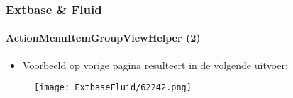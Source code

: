 
\begin{frame}[fragile]
	\frametitle{Extbase \& Fluid}
	\framesubtitle{ActionMenuItemGroupViewHelper (2)}

	\begin{itemize}
		\item Voorbeeld op vorige pagina resulteert in de volgende uitvoer:
	\end{itemize}

	\begin{figure}
		\texttt{[image: ExtbaseFluid/62242.png]}
	\end{figure}

\end{frame}


